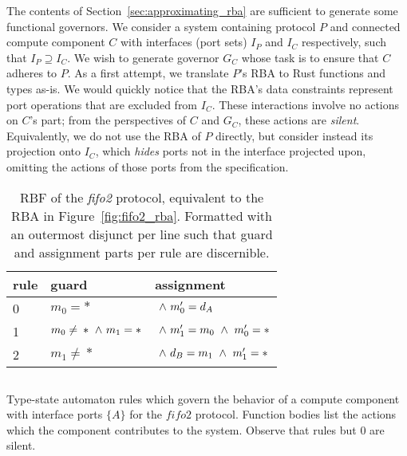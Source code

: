The contents of Section~\ref{sec:approximating_rba} are sufficient to generate some functional governors. We consider a system containing protocol $P$ and connected compute component $C$ with interfaces (port sets) $I_P$ and $I_C$ respectively, such that $I_P \supseteq{} I_C$. We wish to generate governor $G_C$ whose task is to ensure that $C$ adheres to $P$. As a first attempt, we translate $P$'s RBA to Rust functions and types as-is. We would quickly notice that the RBA's data constraints represent port operations that are excluded from $I_C$. These interactions involve no actions on $C$'s part; from the perspectives of $C$ and $G_C$, these actions are \textit{silent}. Equivalently, we do not use the RBA of $P$ directly, but consider instead its projection onto $I_C$, which \textit{hides} ports not in the interface projected upon, omitting the actions of those ports from the specification. 


\begin{table}
	\centering
	\begin{tabular}{l|ll|}
		rule & guard & assignment \\
		\hline
		0 & $m_0=*$ & $\ \wedge{}\ {}m_0'=d_A$\\
		1 & $m_0\neq{}*\ \wedge{}\ {}m_1=*$ & $\ \wedge{}\ {}m_1'=m_0\ \wedge{}\ {}m_0'=*$ \\
		2 & $m_1\neq{}*$ & $\ \wedge{}\ {}d_B=m_1\ \wedge{}\ {}m_1'=*$ \\
		\hline
	\end{tabular}
	\caption[RBF for the fifo2 connector.]{RBF of the \textit{fifo2} protocol, equivalent to the RBA in Figure~\ref{fig:fifo2_rba}. Formatted with an outermost disjunct per line such that guard and assignment parts per rule are discernible.}
	\label{tab:fifo2_rbf_tsa}
\end{table}

\begin{listing}[ht]
	\inputminted[]{rust}{fifo_tsa_2.rs}
	\caption[Type state automaton in Rust with silent rules.]{Type-state automaton rules which govern the behavior of a compute component with interface ports $\{A\}$ for the $fifo2$ protocol. Function bodies list the actions which the component contributes to the system. Observe that rules but 0 are silent.}
	\label{listing:fifo_tsa2}
\end{listing}

